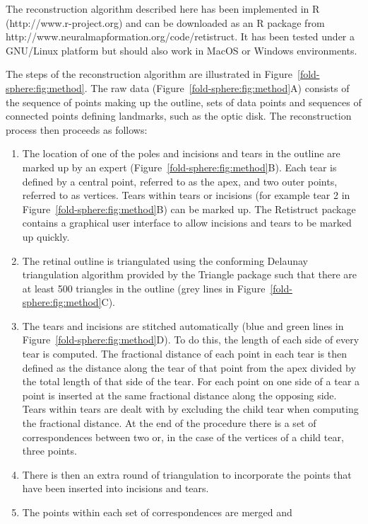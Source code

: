 \documentclass[10pt]{article}
\begin{document}
The reconstruction algorithm described here has been implemented in R
(http://www.r-project.org) and can be downloaded as an R package from
http://www.neuralmapformation.org/code/retistruct. It has been tested
under a GNU/Linux platform but should also work in MacOS or Windows
environments.

The steps of the reconstruction algorithm are illustrated in
Figure~\ref{fold-sphere:fig:method}. The raw data
(Figure~\ref{fold-sphere:fig:method}A) consists of the sequence of
points making up the outline, sets of data points and sequences of
connected points defining landmarks, such as the optic disk. The
reconstruction process then proceeds as follows:
\begin{enumerate}
\item The location of one of the poles and incisions and tears in the
  outline are marked up by an expert
  (Figure~\ref{fold-sphere:fig:method}B). Each tear is defined by a
  central point, referred to as the apex, and two outer points,
  referred to as vertices.  Tears within tears or incisions (for
  example tear 2 in Figure~\ref{fold-sphere:fig:method}B) can be
  marked up. The Retistruct package contains a graphical user
  interface to allow incisions and tears to be marked up quickly.
\item The retinal outline is triangulated using the conforming
  Delaunay triangulation algorithm provided by the Triangle package
  \cite{Shew96tria} such that there are at least 500 triangles in
  the outline (grey lines in Figure~\ref{fold-sphere:fig:method}C).
\item The tears and incisions are stitched automatically (blue and
  green lines in Figure~\ref{fold-sphere:fig:method}D). To do this,
  the length of each side of every tear is computed. The fractional
  distance of each point in each tear is then defined as the distance
  along the tear of that point from the apex divided by the total
  length of that side of the tear. For each point on one side of a
  tear a point is inserted at the same fractional distance along the
  opposing side. Tears within tears are dealt with by excluding the
  child tear when computing the fractional distance. At the end of the
  procedure there is a set of correspondences between two or, in the
  case of the vertices of a child tear, three points.
\item There is then an extra round of triangulation to incorporate the
  points that have been inserted into incisions and tears.
\item The points within each set of correspondences are merged and

\end{enumerate}
\end{document}
